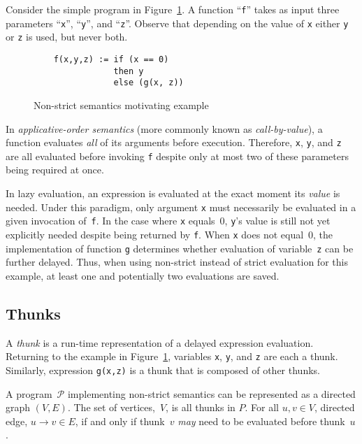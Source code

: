 \documentclass[11pt]{article}
\begin{document}
Consider the simple program in Figure~\ref{fig:LazyEvalExample}.  A function ``\texttt{f}'' takes as input three parameters ``\texttt{x}'', ``\texttt{y}'', and ``\texttt{z}''.  Observe that depending on the value of \texttt{x} either \texttt{y} or \texttt{z} is used, but never both.~\cite{Henderson:1976}

\begin{figure}[ht]
  \centering
  \begin{lstlisting}
    f(x,y,z) := if (x == 0)
                then y
                else (g(x, z))
  \end{lstlisting}
  \caption{Non-strict semantics motivating example}
  \label{fig:LazyEvalExample}
\end{figure}

In \textit{applicative-order semantics} (more commonly known as \textit{call-by-value}), a function evaluates \textit{all} of its arguments before execution.  Therefore, \texttt{x}, \texttt{y}, and \texttt{z} are all evaluated before invoking \texttt{f} despite only at most two of these parameters being required at once.

In lazy evaluation, an expression is evaluated at the exact moment its \textit{value} is needed.  Under this paradigm, only argument \texttt{x} must necessarily be evaluated in a given invocation of~\texttt{f}. In the case where \texttt{x} equals~0, \texttt{y}'s value is still not yet explicitly needed despite being returned by \texttt{f}.  When \texttt{x} does not equal~0, the implementation of function \texttt{g} determines whether evaluation of variable~\texttt{z} can be further delayed. Thus, when using non-strict instead of strict evaluation for this example, at least one and potentially two evaluations are saved.

\subsection{Thunks}\label{sec:Thunks}

A \textit{thunk} is a run-time representation of a delayed expression evaluation.  Returning to the example in Figure~\ref{fig:LazyEvalExample}, variables \texttt{x}, \texttt{y}, and \texttt{z} are each a thunk.  Similarly, expression \texttt{g(x,z)} is a thunk that is composed of other thunks.

A program~$\mathcal{P}$ implementing non-strict semantics can be represented as a directed graph $(V,E)$.  The set of vertices,~$V$, is all thunks in $P$.  For all ${u,v\in V}$, directed edge, ${u \rightarrow v \in E}$, if and only if thunk~$v$ \textit{may} need to be evaluated before thunk~$u$.
\end{document}
